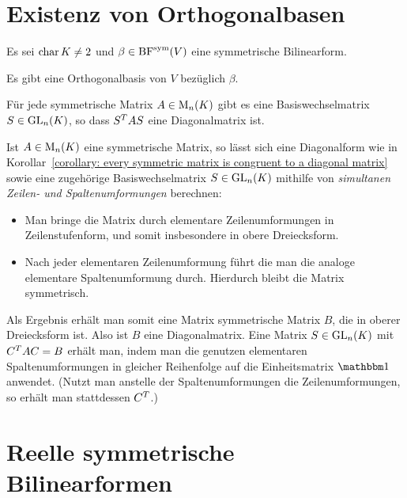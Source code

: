 \section{Existenz von Orthogonalbasen}

Es sei $\operatorname{char} K \neq 2$ und $\beta \in \operatorname{BF}^{\operatorname{sym}}(V)$ eine symmetrische Bilinearform.

\begin{theorem}
  \label{theorem: exstience of an orthogonal basis}
  Es gibt eine Orthogonalbasis von $V$ bezüglich $\beta$.
\end{theorem}

\begin{corollary}
  \label{corollary: every symmetric matrix is congruent to a diagonal matrix}
  Für jede symmetrische Matrix $A \in \operatorname{M}_{n}(K)$ gibt es eine Basiswechselmatrix $S \in \operatorname{GL}_{n}(K)$, so dass $S^T A S$ eine Diagonalmatrix ist.
\end{corollary}

Ist $A \in \operatorname{M}_{n}(K)$ eine symmetrische Matrix, so lässt sich eine Diagonalform wie in Korollar~\ref{corollary: every symmetric matrix is congruent to a diagonal matrix} sowie eine zugehörige Basiswechselmatrix $S \in \operatorname{GL}_{n}(K)$ mithilfe von \emph{simultanen Zeilen- und Spaltenumformungen} berechnen:
\begin{itemize}
  \item
    Man bringe die Matrix durch elementare Zeilenumformungen in Zeilenstufenform, und somit insbesondere in obere Dreiecksform.
  \item
    Nach jeder elementaren Zeilenumformung führt die man die analoge elementare Spaltenumformung durch.
    Hierdurch bleibt die Matrix symmetrisch.
\end{itemize}
Als Ergebnis erhält man somit eine Matrix symmetrische Matrix $B$, die in oberer Dreiecksform ist.
Also ist $B$ eine Diagonalmatrix.
Eine Matrix $S \in \operatorname{GL}_{n}(K)$ mit $C^T A C = B$ erhält man, indem man die genutzen elementaren Spaltenumformungen in gleicher Reihenfolge auf die Einheitsmatrix $\Id$ anwendet.
(Nutzt man anstelle der Spaltenumformungen die Zeilenumformungen, so erhält man stattdessen $C^T$.)






\section{Reelle symmetrische Bilinearformen}

